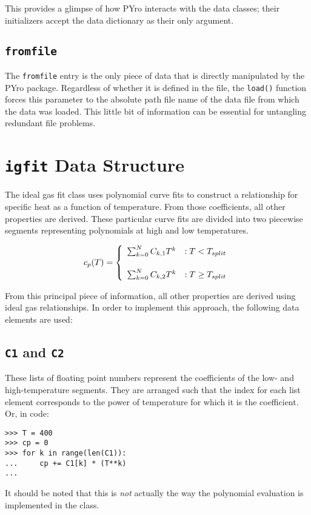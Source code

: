 This provides a glimpse of how PYro interacts with the data classes; their initializers accept the data dictionary as their only argument.

\subsection{\texttt{fromfile}}
The \verb|fromfile| entry is the only piece of data that is directly manipulated by the PYro package.  Regardless of whether it is defined in the file, the \verb|load()| function forces this parameter to the absolute path file name of the data file from which the data was loaded.  This little bit of information can be essential for untangling redundant file problems.






\section{\texttt{igfit} Data Structure}
The ideal gas fit class uses polynomial curve fits to construct a relationship for specific heat as a function of temperature.  From those coefficients, all other properties are derived.  These particular curve fits are divided into two piecewise segments representing polynomials at high and low temperatures.

\begin{align}
c_p(T) = \left\{ \begin{array}{lr} 
\sum_{k=0}^N C_{k,1} T^k & : T<T_{split}\vspace{.5cm}\\
\sum_{k=0}^N C_{k,2} T^k & : T \ge T_{split}\\
\end{array}
\right.
\end{align}

From this principal piece of information, all other properties are derived using ideal gas relationships.  In order to implement this approach, the following data elements are used:

\subsection{\texttt{C1} and \texttt{C2}}
These lists of floating point numbers represent the coefficients of the low- and high-temperature segments.  They are arranged such that the index for each list element corresponds to the power of temperature for which it is the coefficient.  Or, in code:
\begin{verbatim}
>>> T = 400
>>> cp = 0
>>> for k in range(len(C1)):
...     cp += C1[k] * (T**k)
...
\end{verbatim}
It should be noted that this is \emph{not} actually the way the polynomial evaluation is implemented in the class.


